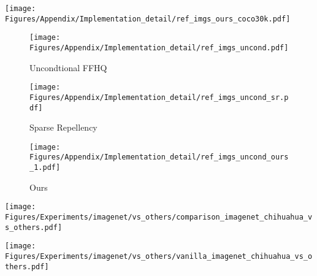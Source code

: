 \begin{figure*}[!ht]
    \centering
    \texttt{[image: Figures/Appendix/Implementation\_detail/ref\_imgs\_ours\_coco30k.pdf]}
    \caption{Uncurated generated images by SAFREE+Ours on CoCo30K}
    \label{fig:coco30k_ours}
\end{figure*}

\begin{figure*}[!ht]
    \centering
    \begin{subfigure}{0.33\textwidth}
            \texttt{[image: Figures/Appendix/Implementation\_detail/ref\_imgs\_uncond.pdf]}
            \caption{Uncondtional FFHQ}
    \end{subfigure}   
    \begin{subfigure}{0.33\textwidth}
            \texttt{[image: Figures/Appendix/Implementation\_detail/ref\_imgs\_uncond\_sr.pdf]}
            \caption{Sparse Repellency}
    \end{subfigure}   
    \begin{subfigure}{0.33\textwidth}
            \texttt{[image: Figures/Appendix/Implementation\_detail/ref\_imgs\_uncond\_ours\_1.pdf]}
            \caption{Ours}
    \end{subfigure}   
    \caption{Comparison of \textit{Safe Denoiser} against existing approaches when negation on female.}
    \label{fig:ffhq_comparision}
\end{figure*}


%
%
%
%
%
%


\begin{figure*}[!ht]
    \centering
    \texttt{[image: Figures/Experiments/imagenet/vs\_others/comparison\_imagenet\_chihuahua\_vs\_others.pdf]}
    \caption{Comparison of \textit{Safe Denoiser} against existing approaches when negation on Chihuahua. This comparison includes non-dog related ImageNet classes, which include Tench, Garbage Truck, Church, Spoonbill, and Great White Shark.}
    \label{fig:imagenet_comparison_others}
\end{figure*}

\begin{figure*}[!ht]
    \centering
    \texttt{[image: Figures/Experiments/imagenet/vs\_others/vanilla\_imagenet\_chihuahua\_vs\_others.pdf]}
    \caption{Classifier guidance diffusion model generated samples when negating on Chihuahua. This comparison includes non-dog-related ImageNet classes mentioned in~\ref{fig:imagenet_comparison_others} along with the dog-related classes in Figure~~\ref{fig:imagenet_comparison_dogs} which are Pomeranian, Yorkshire Terrier, and Shih Tzu.}
    \label{fig:imagenet_vanilla_samples}
\end{figure*}

